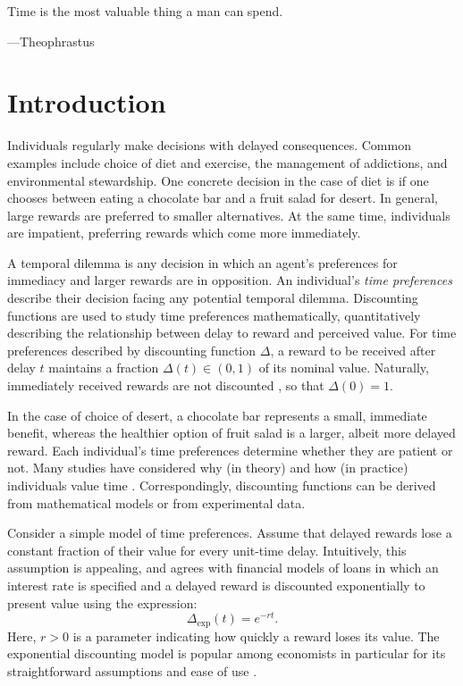 \documentclass[titlepage, hidelinks, 12pt]{article}
\theoremstyle{plain}
\theoremstyle{remark}
\theoremstyle{definition}
\begin{document}
\epigraph{Time is the most valuable thing a man can spend.}{---Theophrastus}
\linenumbers
\section{Introduction}


Individuals regularly make decisions with delayed consequences. 
Common examples include choice of diet and 
exercise, the management of addictions, and environmental stewardship.
One concrete decision in the case of diet is if one chooses between eating a chocolate bar and a fruit salad for desert. 
In general, large rewards are preferred to smaller alternatives. At the same time, 
individuals are impatient, preferring rewards which come more immediately.

A temporal dilemma is any decision in which an agent's preferences for immediacy and larger rewards are in opposition. 
An individual's \textit{time preferences} describe their decision facing any potential temporal dilemma. 
Discounting functions are used to study time preferences mathematically, quantitatively describing the relationship between delay to 
reward and perceived value. 
For time preferences described by discounting function $\Delta$, 
a reward to be received after delay $t$ maintains a fraction $\Delta(t)\in(0, 1)$ of its nominal value. Naturally, immediately received
rewards are not discounted , so that $\Delta(0) = 1$. 

In the case of choice of desert, a chocolate bar represents a small, immediate benefit, whereas the healthier option of
fruit salad is a larger, albeit more delayed reward. Each individual's time preferences determine whether they are patient
or not. 
Many studies
have considered why (in theory) and how (in practice) individuals value time \cite{mazur85, ainslie75, green81, green04}. 
Correspondingly, discounting functions
can be derived from mathematical models or from experimental data. 

Consider a simple model of time preferences.
Assume that delayed rewards lose a constant fraction of their value for every unit-time delay. Intuitively, this assumption is appealing,
and agrees with financial models of loans in which an interest rate is specified and a delayed reward is discounted exponentially
to present value using the expression:
\begin{equation}
    \Delta_{\exp}(t) = e^{-r t}.
\end{equation}
Here, $r>0$ is a parameter indicating how quickly a reward loses its value. The exponential discounting model is popular among economists in particular
for its straightforward assumptions and ease of use \cite{sozou98}. 
\end{document}
